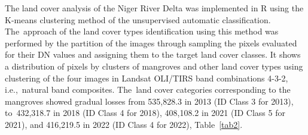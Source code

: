 \documentclass[jmse,article,accept,pdftex,moreauthors]{Definitions/mdpi}
\begin{document}
The land cover analysis of the Niger River Delta was implemented in R using the K-means clustering method of the unsupervised automatic classification. The~approach of the land cover types identification using this method was performed by the partition of the images through sampling the pixels evaluated for their DN values and assigning them to the target land  cover classes. It shows a distribution of pixels by clusters of mangroves and other land cover types using clustering of the four images in Landsat OLI/TIRS band combinations 4-3-2, i.e.,~natural band composites. The~land cover categories corresponding to the mangroves showed gradual losses from 535,828.3 in 2013 (ID Class 3 for 2013), to~432,318.7 in 2018 (ID Class 4 for 2018), 408,108.2 in 2021 (ID Class 5 for 2021), and 416,219.5 in 2022 (ID Class 4 for 2022), Table~\ref{tab2}.
\end{document}
